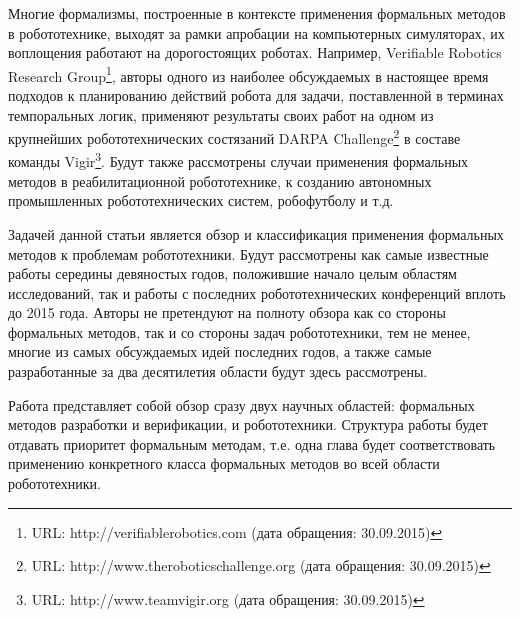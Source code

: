 \documentclass[a4, 14pt]{article}
\begin{document}
Многие формализмы, построенные в контексте применения формальных методов в 
робототехнике, выходят за рамки апробации на компьютерных симуляторах, их 
воплощения работают на дорогостоящих роботах. Например, Verifiable Robotics 
Research Group\footnote{URL: http://verifiablerobotics.com (дата обращения: 30.09.2015)}, 
авторы одного из наиболее обсуждаемых в настоящее время подходов 
к планированию действий робота для задачи, поставленной в терминах темпоральных 
логик, применяют результаты своих работ на одном из крупнейших робототехнических 
состязаний DARPA Challenge\footnote{URL: http://www.theroboticschallenge.org (дата обращения: 30.09.2015)}
 в составе команды Vigir\footnote{URL: http://www.teamvigir.org (дата обращения: 30.09.2015)}. 
Будут также рассмотрены случаи применения формальных методов в реабилитационной 
робототехнике, к созданию автономных промышленных робототехнических систем, 
робофутболу и т.д.

Задачей данной статьи является обзор и классификация применения формальных 
методов к проблемам робототехники. Будут рассмотрены как самые известные работы 
середины девяностых годов, положившие начало целым областям исследований, так и 
работы с последних робототехнических конференций вплоть до 2015 года. Авторы не 
претендуют на полноту обзора как со стороны формальных методов, так и со стороны 
задач робототехники, тем не менее, многие из самых обсуждаемых идей последних 
годов, а также самые разработанные за два десятилетия области будут здесь рассмотрены.

Работа представляет собой обзор сразу двух научных областей: формальных методов 
разработки и верификации, и робототехники. Структура работы будет отдавать 
приоритет формальным методам, т.е. одна глава будет соответствовать применению 
конкретного класса формальных методов во всей области робототехники. 
\end{document}
